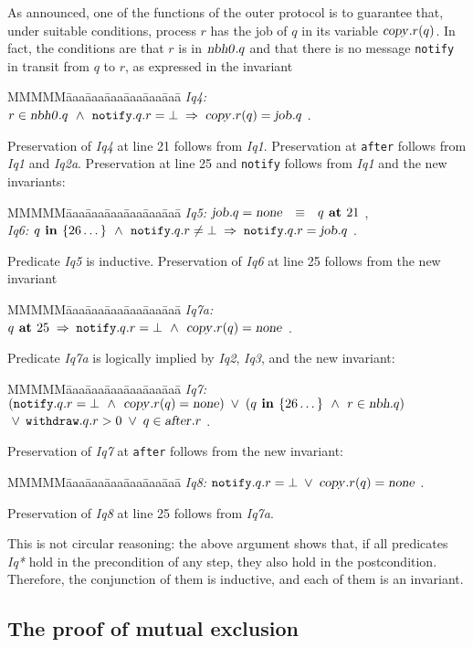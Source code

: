 \documentclass[10pt]{article} \usepackage[english]{babel}
\newenvironment{tab}{\begin{tabbing}
MMMMM\=aaa\=aaa\=aaa\=aaa\=aaa\=aaa\= \kill}{\end{tabbing}}
\def\S #1/{\mbox {\textsl{#1}}}
\def\B #1/{\mbox {\textbf{#1}}}
\def\T #1/{\mbox {\texttt{#1}}}
\def\Implies{\;\Rightarrow\;}
\def\EQ     {\mbox{\quad$\equiv$\quad}}
\def\Land   {\mbox{ $\;\land\;$ }}
\def\Lor    {\;\lor\;}
\begin{document}
As announced, one of the functions of the outer protocol is to
guarantee that, under suitable conditions, process $r$ has the job of
$q$ in its variable $\S copy/.r(q)$.  In fact, the conditions are that
$r$ is in $\S nbh0/.q$ and that there is no message \T notify/ in
transit from $q$ to $r$, as expressed in the invariant
\begin{tab}
\S Iq4:/ \> $ r \in\S nbh0/.q \Land \T notify/.q.r = \bot 
 \Implies \S copy/.r(q) = \S job/.q $ .
\end{tab}

Preservation of \S Iq4/ at line 21 follows from \S Iq1/.  Preservation
at \T after/ follows from \S Iq1/ and \S Iq2a/.  Preservation at line
25 and \T notify/ follows from \S Iq1/ and the new invariants:
\begin{tab}
\S Iq5:/ \> $ \S job/.q = \S none/ \EQ q\B\ at / 21 $ ,\\
\S Iq6:/ \> $ q \B\ in /\{26\dots\} \Land
\T notify/.q.r \ne \bot \Implies \T notify/.q.r = \S job/.q $ .
\end{tab}
Predicate \S Iq5/ is inductive.  Preservation of \S Iq6/ at line 25
follows from the new invariant
\begin{tab}
\S Iq7a:/ \> $ q\B\ at /25 \Implies
\T notify/.q.r = \bot\Land \S copy/.r(q) =\S none/ $ .
\end{tab}
Predicate \S Iq7a/ is logically implied by \S Iq2/, \S Iq3/, and the new
invariant:
\begin{tab}
\S Iq7:/ \> $ (\T notify/.q.r = \bot\Land \S copy/.r(q) =\S none/)
\Lor (q \B\ in /\{26\dots\} \Land r\in\S nbh/.q) $\\
\> $  \Lor\, \T withdraw/.q.r > 0 \Lor q\in\S after/.r $ .
\end{tab}
Preservation of \S Iq7/ at \T after/ follows from the new invariant:
\begin{tab}
\S Iq8:/ \> $ \T notify/.q.r = \bot \Lor \S copy/.r(q) = \S none/$ .
\end{tab}
Preservation of \S Iq8/ at line 25 follows from \S Iq7a/. 

This is not circular reasoning: the above argument shows that, if all
predicates \S Iq*/ hold in the precondition of any step, they also
hold in the postcondition. Therefore, the conjunction of them is
inductive, and each of them is an invariant.

\subsection{The proof of mutual exclusion} \label{mx_proof}
\end{document}
